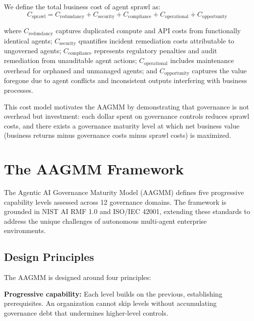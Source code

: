 \documentclass[ai,article,submit,pdftex,moreauthors]{Definitions/mdpi}
\begin{document}
We define the total business cost of agent sprawl as:
\begin{equation}\label{eq:sprawl-cost}
C_{\text{sprawl}} = C_{\text{redundancy}} + C_{\text{security}} + C_{\text{compliance}} + C_{\text{operational}} + C_{\text{opportunity}}
\end{equation}

\noindent where $C_{\text{redundancy}}$ captures duplicated compute and API costs from functionally identical agents; $C_{\text{security}}$ quantifies incident remediation costs attributable to ungoverned agents; $C_{\text{compliance}}$ represents regulatory penalties and audit remediation from unauditable agent actions; $C_{\text{operational}}$ includes maintenance overhead for orphaned and unmanaged agents; and $C_{\text{opportunity}}$ captures the value foregone due to agent conflicts and inconsistent outputs interfering with business processes.

This cost model motivates the AAGMM by demonstrating that governance is not overhead but investment: each dollar spent on governance controls reduces sprawl costs, and there exists a governance maturity level at which net business value (business returns minus governance costs minus sprawl costs) is maximized.


\section{The AAGMM Framework}\label{sec:framework}

The Agentic AI Governance Maturity Model (AAGMM) defines five progressive capability levels assessed across 12 governance domains. The framework is grounded in NIST AI RMF 1.0 and ISO/IEC 42001, extending these standards to address the unique challenges of autonomous multi-agent enterprise environments.

\subsection{Design Principles}\label{sec:framework-principles}

The AAGMM is designed around four principles:

\textbf{Progressive capability:} Each level builds on the previous, establishing prerequisites. An organization cannot skip levels without accumulating governance debt that undermines higher-level controls.
\end{document}
